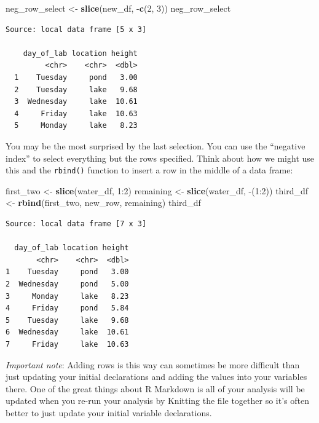 \documentclass[twoside, 12pt]{article}
\newenvironment{Shaded}{\begin{snugshade}}{\end{snugshade}}
\newcommand{\KeywordTok}[1]{\textcolor[rgb]{0.13,0.29,0.53}{\textbf{{#1}}}}
\newcommand{\DecValTok}[1]{\textcolor[rgb]{0.00,0.00,0.81}{{#1}}}
\newcommand{\StringTok}[1]{\textcolor[rgb]{0.31,0.60,0.02}{{#1}}}
\newcommand{\NormalTok}[1]{{#1}}
\begin{document}
\begin{itemize}
\begin{Shaded}
\begin{Highlighting}[]
\NormalTok{neg_row_select <-}\StringTok{ }\KeywordTok{slice}\NormalTok{(new_df, -}\KeywordTok{c}\NormalTok{(}\DecValTok{2}\NormalTok{, }\DecValTok{3}\NormalTok{))}
\NormalTok{neg_row_select}
\end{Highlighting}
\end{Shaded}

  \begin{Verbatim}[frame=single]
  Source: local data frame [5 x 3]

    day_of_lab location height
         <chr>    <chr>  <dbl>
  1    Tuesday     pond   3.00
  2    Tuesday     lake   9.68
  3  Wednesday     lake  10.61
  4     Friday     lake  10.63
  5     Monday     lake   8.23
  \end{Verbatim}
\end{itemize}

You may be the most surprised by the last selection. You can use the
``negative index'' to select everything but the rows specified. Think
about how we might use this and the \texttt{rbind()} function to insert
a row in the middle of a data frame:

\begin{Shaded}
\begin{Highlighting}[]
\NormalTok{first_two <-}\StringTok{ }\KeywordTok{slice}\NormalTok{(water_df, }\DecValTok{1}\NormalTok{:}\DecValTok{2}\NormalTok{)}
\NormalTok{remaining <-}\StringTok{ }\KeywordTok{slice}\NormalTok{(water_df, -(}\DecValTok{1}\NormalTok{:}\DecValTok{2}\NormalTok{))}
\NormalTok{third_df <-}\StringTok{ }\KeywordTok{rbind}\NormalTok{(first_two, new_row, remaining)}
\NormalTok{third_df}
\end{Highlighting}
\end{Shaded}

\begin{Verbatim}[frame=single]
Source: local data frame [7 x 3]

  day_of_lab location height
       <chr>    <chr>  <dbl>
1    Tuesday     pond   3.00
2  Wednesday     pond   5.00
3     Monday     lake   8.23
4     Friday     pond   5.84
5    Tuesday     lake   9.68
6  Wednesday     lake  10.61
7     Friday     lake  10.63
\end{Verbatim}

\emph{Important note}: Adding rows is this way can sometimes be more
difficult than just updating your initial declarations and adding the
values into your variables there. One of the great things about R
Markdown is all of your analysis will be updated when you re-run your
analysis by Knitting the file together so it's often better to just
update your initial variable declarations.
\end{document}
